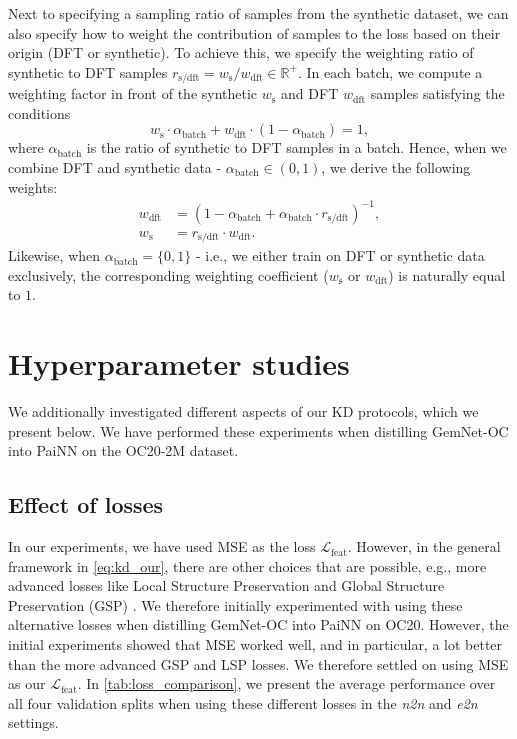 \documentclass{article}
\newcommand{\loss}{\mathcal{L}}
\begin{document}
Next to specifying a sampling ratio of samples from the synthetic dataset, we can also specify how to weight the contribution of samples to the loss based on their origin (DFT or synthetic). To achieve this, we specify the weighting ratio of synthetic to DFT samples $r_{\text{s/dft}} = w_{\text{s}}/w_{\text{dft}} \in \mathbb{R}^+$. In each batch, we compute a weighting factor in front of the synthetic $w_\text{s}$ and DFT $w_{\text{dft}}$ samples satisfying the conditions 
\begin{equation}
    w_\text{s} \cdot  \alpha_{\text{batch}} + w_{\text{dft}} \cdot (1-\alpha_{\text{batch}}) = 1,
\end{equation}
where $\alpha_{\text{batch}}$ is the ratio of synthetic to DFT samples in a batch. Hence, when we combine DFT and synthetic data - $\alpha_{\text{batch}} \in(0,1)$, we derive the following weights:
\begin{align}
  w_{\text{dft}}&=(1-\alpha_{\text{batch}}+\alpha_{\text{batch}} \cdot r_{\text{s/dft}})^{-1},\\
  w_{\text{s}}&=r_{\text{s/dft}} \cdot w_{\text{dft}}.
\end{align}
Likewise, when $\alpha_{\text{batch}}=\{0, 1\}$ - i.e., we either train on DFT or synthetic data exclusively, the corresponding weighting coefficient ($w_\text{s}$ or $w_{\text{dft}}$) is naturally equal to $1$.

\newpage
\section{Hyperparameter studies}
\label{ap:hyperparams}
We additionally investigated different aspects of our KD protocols, which we present below. We have performed these experiments when distilling GemNet-OC into PaiNN on the OC20-2M dataset.

\subsection{Effect of losses}
\label{ap:losses}
In our experiments, we have used MSE as the loss $\loss_{\text{feat}}$. However, in the general framework in \cref{eq:kd_our}, there are other choices that are possible, e.g., more advanced losses like Local Structure Preservation \cite{yang2021distilling} and Global Structure Preservation (GSP) \cite{joshi2022}. We therefore initially experimented with using these alternative losses when distilling GemNet-OC into PaiNN on OC20. However, the initial experiments showed that MSE worked well, and in particular, a lot better than the more advanced GSP and LSP losses. We therefore settled on using MSE as our $\loss_{\text{feat}}$. In \cref{tab:loss_comparison}, we present the average performance over all four validation splits when using these different losses in the \emph{n2n} and \emph{e2n} settings.
\end{document}
